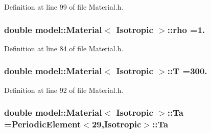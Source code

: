 Definition at line 99 of file Material.\+h.

\hypertarget{classmodel_1_1_material_3_01_isotropic_01_4_ae892574680a428d133451e44a23aad41}{}
\subsubsection[{rho}]{\setlength{\rightskip}{0pt plus 5cm}double {\bf model\+::\+Material}$<$ {\bf Isotropic} $>$\+::rho =1.\hspace{0.3cm}{\ttfamily [static]}}\label{classmodel_1_1_material_3_01_isotropic_01_4_ae892574680a428d133451e44a23aad41}


Definition at line 84 of file Material.\+h.

\hypertarget{classmodel_1_1_material_3_01_isotropic_01_4_ac8253463339421c8137b2aa195488a8c}{}
\subsubsection[{T}]{\setlength{\rightskip}{0pt plus 5cm}double {\bf model\+::\+Material}$<$ {\bf Isotropic} $>$\+::T =300.\hspace{0.3cm}{\ttfamily [static]}}\label{classmodel_1_1_material_3_01_isotropic_01_4_ac8253463339421c8137b2aa195488a8c}


Definition at line 92 of file Material.\+h.

\hypertarget{classmodel_1_1_material_3_01_isotropic_01_4_a607cee4e5a3a8df415708dd1dd90c678}{}
\subsubsection[{Ta}]{\setlength{\rightskip}{0pt plus 5cm}double {\bf model\+::\+Material}$<$ {\bf Isotropic} $>$\+::Ta ={\bf Periodic\+Element}$<$29,{\bf Isotropic}$>$\+::Ta\hspace{0.3cm}{\ttfamily [static]}}\label{classmodel_1_1_material_3_01_isotropic_01_4_a607cee4e5a3a8df415708dd1dd90c678}


